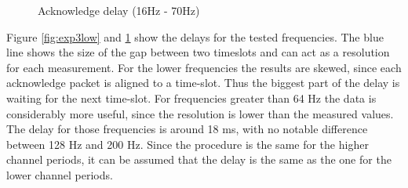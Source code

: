 \begin{description}
\begin{figure}[h]
		\caption{Acknowledge delay (16Hz - 70Hz)}\label{fig:exp3high}
	\end{figure}
	Figure \ref{fig:exp3low} and \ref{fig:exp3high} show the delays for the tested frequencies. The blue line shows the size of the gap between two timeslots and can act as a resolution for each measurement. For the lower frequencies the results are skewed, since each acknowledge packet is aligned to a time-slot. Thus the biggest part of the delay is waiting for the next time-slot. For frequencies greater than 64 Hz the data is considerably more useful, since the resolution is lower than the measured values. The delay for those frequencies is around 18 ms, with no notable difference between 128 Hz and 200 Hz. Since the procedure is the same for the higher channel periods, it can be assumed that the delay is the same as the one for the lower channel periods.
\end{description}
\newpage


